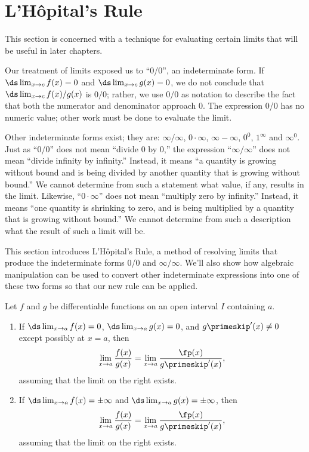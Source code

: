 \section{L'H\^opital's Rule}\label{sec:lhopitals_rule}

This section is concerned with a technique for evaluating certain limits that will be useful in later chapters.

Our treatment of limits exposed us to ``0/0'', an indeterminate form. If $\ds \lim_{x\to c}f(x)=0$ and $\ds \lim_{x\to c} g(x) =0$, we do not conclude that $\ds \lim_{x\to c} f(x)/g(x)$ is $0/0$; rather, we use $0/0$ as notation to describe the fact that both the numerator and denominator approach 0. The expression 0/0 has no numeric value; other work must be done to evaluate the limit.

Other indeterminate forms exist; they are: $\infty/\infty$, $0\cdot\infty$, $\infty-\infty$, $0^0$, $1^\infty$ and $\infty^0$. Just as ``0/0'' does not mean ``divide 0 by 0,'' the expression ``$\infty/\infty$'' does not mean ``divide infinity by infinity.'' Instead, it means ``a quantity is growing without bound and is being divided by another quantity that is growing without bound.'' We cannot determine from such a statement what value, if any, results in the limit. Likewise, ``$0\cdot \infty$'' does not mean ``multiply zero by infinity.'' Instead, it means ``one quantity is shrinking to zero, and is being multiplied by a quantity that is growing without bound.'' We cannot determine from such a description what the result of such a limit will be.

This section introduces L'H\^opital's Rule, a method of resolving limits that produce the indeterminate forms 0/0 and $\infty/\infty$. We'll also show how algebraic manipulation can be used to convert other indeterminate expressions into one of these two forms so that our new rule can be applied.

\begin{theorem}\label{thm:LHR_1}
Let $f$ and $g$ be differentiable functions on an open interval $I$ containing $a$.
\begin{enumerate}
\item If $\ds\lim_{x\to a}f(x)=0$, $\ds\lim_{x\to a}g(x)=0$, and $g\primeskip'(x)\neq 0$ except possibly at $x=a$, then \[\lim_{x\to a}\frac{f(x)}{g(x)}=\lim_{x\to a} \frac{\fp(x)}{g\primeskip'(x)},\]
assuming that the limit on the right exists.
\item If  $\ds\lim_{x\to a}f(x)=\pm\infty$ and $\ds\lim_{x\to a}g(x)=\pm\infty$, then \[\lim_{x\to a}\frac{f(x)}{g(x)}=\lim_{x\to a} \frac{\fp(x)}{g\primeskip'(x)},\]
assuming that the limit on the right exists.
\end{enumerate}
\end{theorem}


